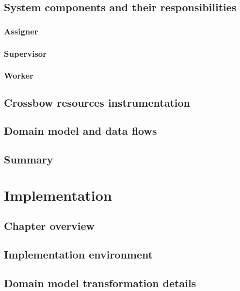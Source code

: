 \documentclass[11pt]{book}
\begin{document}
    \section{System components and their responsibilities}

      \subsection{Assigner}

      \subsection{Supervisor}

      \subsection{Worker}


    \section{Crossbow resources instrumentation}


    \section{Domain model and data flows} \label{sec:domain-model}


    \section*{Summary}


  \chapter{Implementation}
    
    \section*{Chapter overview}


    \section{Implementation environment}


    \section{Domain model transformation details}
\end{document}
